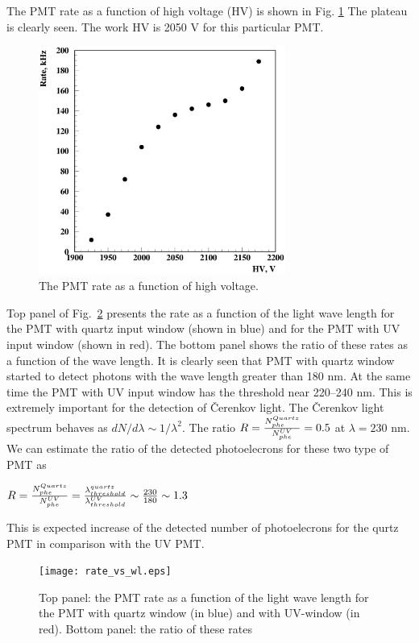 \documentclass[11pt,titlepage]{article}
\begin{document}
The PMT rate as a function of high voltage (HV) is shown in Fig. \ref{plateau}  
The plateau is clearly seen. The work HV is 2050 V for this particular PMT.
 \begin{figure}
 \hspace{0.5cm}
 \begin{centering}
  \includegraphics[height=7.5cm]{plateau.eps}
 \vspace{0.5cm}
 \caption{\label{plateau}
The PMT rate as a function of high voltage.}
 \end{centering}
 \end{figure}

Top panel of Fig.~\ref{rt_vs_wl} presents the rate as a function of the light wave length
for the PMT with quartz input window (shown in blue) and for the PMT with UV input window
(shown in red). The bottom panel shows the ratio of these rates as a function of the
wave length. It is clearly seen that PMT with quartz window started to detect photons with 
the wave length greater than 180 nm. At the same time the PMT with UV input window has 
the threshold near 220--240 nm. This is extremely important for the detection of  \v Cerenkov
light. The   \v Cerenkov light spectrum behaves as $dN/d\lambda \sim 1/\lambda^2$.
The ratio  $R={N_{phe}^{Quartz} \over N_{phe}^{UV}}=0.5$ at $ \lambda=230$ nm.
We can estimate the ratio of the detected photoelecrons for these two type of PMT as

$ R={N_{phe}^{Quartz} \over N_{phe}^{UV}}={\lambda_{threshold}^{quartz} \over \lambda_{threshold}^{UV}}\sim {230\over 180}\sim 1.3 $

This is expected increase of the detected number of photoelecrons for the qurtz PMT in comparison with
the UV PMT.

 \begin{figure}
 \hspace{0.5cm}
 \begin{centering}
  \texttt{[image: rate\_vs\_wl.eps]}
 \vspace{0.5cm}
 \caption{\label{rt_vs_wl}
Top panel: the PMT rate as a function of the light wave length
for the PMT with quartz window (in blue) and with UV-window (in red).
Bottom panel: the ratio of these rates}
 \end{centering}
 \end{figure}
\end{document}
